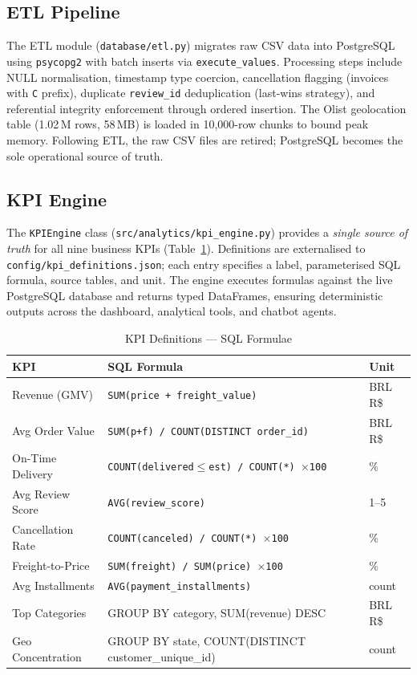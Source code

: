 \documentclass[conference]{IEEEtran}
\begin{document}
\subsection{ETL Pipeline}

The ETL module (\texttt{database/etl.py}) migrates raw CSV data into PostgreSQL using
\texttt{psycopg2} with batch inserts via \texttt{execute\_values}.  Processing steps include
NULL normalisation, timestamp type coercion, cancellation flagging (invoices with \texttt{C}
prefix), duplicate \texttt{review\_id} deduplication (last-wins strategy), and referential
integrity enforcement through ordered insertion.  The Olist geolocation table
(1.02\,M rows, 58\,MB) is loaded in 10{,}000-row chunks to bound peak memory.
Following ETL, the raw CSV files are retired; PostgreSQL becomes the sole operational
source of truth.

\subsection{KPI Engine}

The \texttt{KPIEngine} class (\texttt{src/analytics/kpi\_engine.py}) provides a
\textit{single source of truth} for all nine business KPIs (Table~\ref{tab:kpis}).
Definitions are externalised to \texttt{config/kpi\_definitions.json}; each entry
specifies a label, parameterised SQL formula, source tables, and unit.  The engine
executes formulas against the live PostgreSQL database and returns typed DataFrames,
ensuring deterministic outputs across the dashboard, analytical tools, and chatbot agents.

\begin{table}[H]
\centering
\caption{KPI Definitions — SQL Formulae}
\label{tab:kpis}
\scriptsize
\setlength{\tabcolsep}{3pt}
\begin{tabularx}{\linewidth}{@{}l X l@{}}
\toprule
\textbf{KPI} & \textbf{SQL Formula} & \textbf{Unit} \\
\midrule
Revenue (GMV)     & \texttt{SUM(price + freight\_value)}                         & BRL R\$ \\
Avg Order Value   & \texttt{SUM(p+f) / COUNT(DISTINCT order\_id)}               & BRL R\$ \\
On-Time Delivery  & \texttt{COUNT(delivered$\le$est) / COUNT(*) $\times$100}     & \% \\
Avg Review Score  & \texttt{AVG(review\_score)}                                   & 1–5 \\
Cancellation Rate & \texttt{COUNT(canceled) / COUNT(*) $\times$100}               & \% \\
Freight-to-Price  & \texttt{SUM(freight) / SUM(price) $\times$100}                & \% \\
Avg Installments  & \texttt{AVG(payment\_installments)}                            & count \\
Top Categories    & GROUP BY category, SUM(revenue) DESC                         & BRL R\$ \\
Geo Concentration & GROUP BY state, COUNT(DISTINCT customer\_unique\_id)          & count \\
\bottomrule
\end{tabularx}
\end{table}
\end{document}

